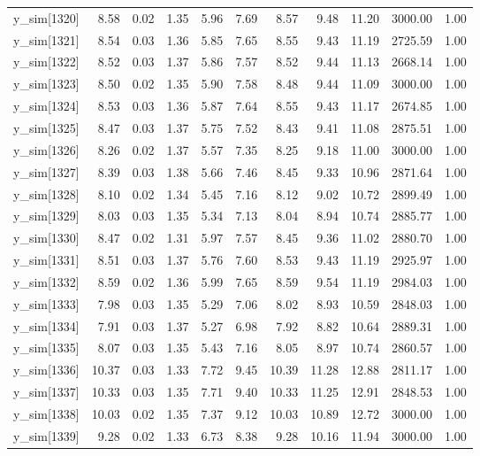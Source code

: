 \begin{table}[ht]
\begin{tabular}{rrrrrrrrrrr}
  y\_sim[1320] & 8.58 & 0.02 & 1.35 & 5.96 & 7.69 & 8.57 & 9.48 & 11.20 & 3000.00 & 1.00 \\ 
  y\_sim[1321] & 8.54 & 0.03 & 1.36 & 5.85 & 7.65 & 8.55 & 9.43 & 11.19 & 2725.59 & 1.00 \\ 
  y\_sim[1322] & 8.52 & 0.03 & 1.37 & 5.86 & 7.57 & 8.52 & 9.44 & 11.13 & 2668.14 & 1.00 \\ 
  y\_sim[1323] & 8.50 & 0.02 & 1.35 & 5.90 & 7.58 & 8.48 & 9.44 & 11.09 & 3000.00 & 1.00 \\ 
  y\_sim[1324] & 8.53 & 0.03 & 1.36 & 5.87 & 7.64 & 8.55 & 9.43 & 11.17 & 2674.85 & 1.00 \\ 
  y\_sim[1325] & 8.47 & 0.03 & 1.37 & 5.75 & 7.52 & 8.43 & 9.41 & 11.08 & 2875.51 & 1.00 \\ 
  y\_sim[1326] & 8.26 & 0.02 & 1.37 & 5.57 & 7.35 & 8.25 & 9.18 & 11.00 & 3000.00 & 1.00 \\ 
  y\_sim[1327] & 8.39 & 0.03 & 1.38 & 5.66 & 7.46 & 8.45 & 9.33 & 10.96 & 2871.64 & 1.00 \\ 
  y\_sim[1328] & 8.10 & 0.02 & 1.34 & 5.45 & 7.16 & 8.12 & 9.02 & 10.72 & 2899.49 & 1.00 \\ 
  y\_sim[1329] & 8.03 & 0.03 & 1.35 & 5.34 & 7.13 & 8.04 & 8.94 & 10.74 & 2885.77 & 1.00 \\ 
  y\_sim[1330] & 8.47 & 0.02 & 1.31 & 5.97 & 7.57 & 8.45 & 9.36 & 11.02 & 2880.70 & 1.00 \\ 
  y\_sim[1331] & 8.51 & 0.03 & 1.37 & 5.76 & 7.60 & 8.53 & 9.43 & 11.19 & 2925.97 & 1.00 \\ 
  y\_sim[1332] & 8.59 & 0.02 & 1.36 & 5.99 & 7.65 & 8.59 & 9.54 & 11.19 & 2984.03 & 1.00 \\ 
  y\_sim[1333] & 7.98 & 0.03 & 1.35 & 5.29 & 7.06 & 8.02 & 8.93 & 10.59 & 2848.03 & 1.00 \\ 
  y\_sim[1334] & 7.91 & 0.03 & 1.37 & 5.27 & 6.98 & 7.92 & 8.82 & 10.64 & 2889.31 & 1.00 \\ 
  y\_sim[1335] & 8.07 & 0.03 & 1.35 & 5.43 & 7.16 & 8.05 & 8.97 & 10.74 & 2860.57 & 1.00 \\ 
  y\_sim[1336] & 10.37 & 0.03 & 1.33 & 7.72 & 9.45 & 10.39 & 11.28 & 12.88 & 2811.17 & 1.00 \\ 
  y\_sim[1337] & 10.33 & 0.03 & 1.35 & 7.71 & 9.40 & 10.33 & 11.25 & 12.91 & 2848.53 & 1.00 \\ 
  y\_sim[1338] & 10.03 & 0.02 & 1.35 & 7.37 & 9.12 & 10.03 & 10.89 & 12.72 & 3000.00 & 1.00 \\ 
  y\_sim[1339] & 9.28 & 0.02 & 1.33 & 6.73 & 8.38 & 9.28 & 10.16 & 11.94 & 3000.00 & 1.00 \\ 

\end{tabular}
\end{table}

